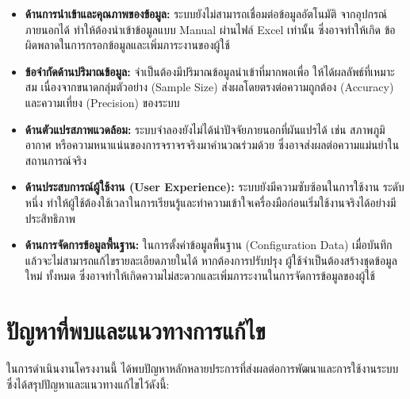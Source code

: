 \begin{itemize}
    \item \textbf{ด้านการนำเข้าและคุณภาพของข้อมูล:} ระบบยังไม่สามารถเชื่อมต่อข้อมูลอัตโนมัติ
    จากอุปกรณ์ภายนอกได้ ทำให้ต้องนำเข้าข้อมูลแบบ Manual ผ่านไฟล์ Excel เท่านั้น ซึ่งอาจทำให้เกิด
    ข้อผิดพลาดในการกรอกข้อมูลและเพิ่มภาระงานของผู้ใช้
    \item \textbf{ข้อจำกัดด้านปริมาณข้อมูล:} จำเป็นต้องมีปริมาณข้อมูลนำเข้าที่มากพอเพื่อ
    ให้ได้ผลลัพธ์ที่เหมาะสม เนื่องจากขนาดกลุ่มตัวอย่าง (Sample Size) ส่งผลโดยตรงต่อความถูกต้อง 
    (Accuracy) และความเที่ยง (Precision) ของระบบ
    \item \textbf{ด้านตัวแปรสภาพแวดล้อม:} ระบบจำลองยังไม่ได้นำปัจจัยภายนอกที่ผันแปรได้ 
    เช่น สภาพภูมิอากาศ หรือความหนาแน่นของการจราจรจริงมาคำนวณร่วมด้วย 
    ซึ่งอาจส่งผลต่อความแม่นยำในสถานการณ์จริง
    \item \textbf{ด้านประสบการณ์ผู้ใช้งาน (User Experience):} ระบบยังมีความซับซ้อนในการใช้งาน
    ระดับหนึ่ง ทำให้ผู้ใช้ต้องใช้เวลาในการเรียนรู้และทำความเข้าใจเครื่องมือก่อนเริ่มใช้งานจริงได้อย่างมีประสิทธิภาพ
    \item \textbf{ด้านการจัดการข้อมูลพื้นฐาน:} ในการตั้งค่าข้อมูลพื้นฐาน (Configuration Data) 
    เมื่อบันทึกแล้วจะไม่สามารถแก้ไขรายละเอียดภายในได้ หากต้องการปรับปรุง ผู้ใช้จำเป็นต้องสร้างชุดข้อมูลใหม่
    ทั้งหมด ซึ่งอาจทำให้เกิดความไม่สะดวกและเพิ่มภาระงานในการจัดการข้อมูลของผู้ใช้
\end{itemize}

\section{ปัญหาที่พบและแนวทางการแก้ไข}
ในการดำเนินงานโครงงานนี้ ได้พบปัญหาหลักหลายประการที่ส่งผลต่อการพัฒนาและการใช้งานระบบ 
ซึ่งได้สรุปปัญหาและแนวทางแก้ไขไว้ดังนี้:

